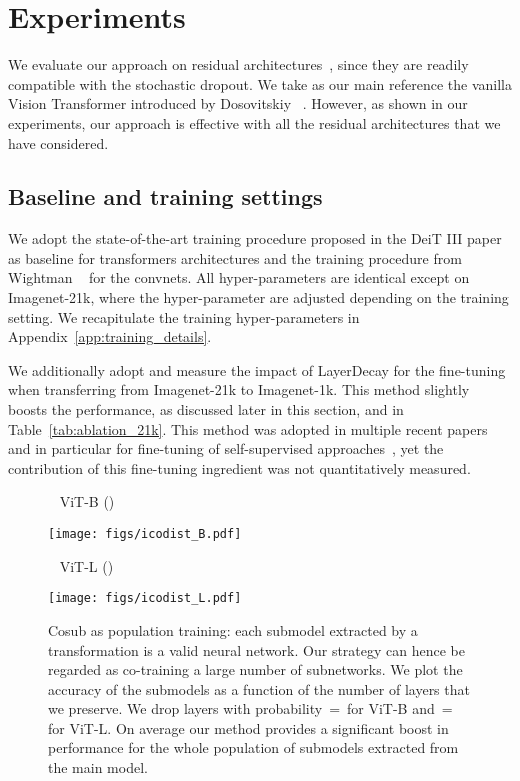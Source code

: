 \section{Experiments}

We evaluate our approach on residual architectures~\cite{He2016ResNet,He2016IdentityMappings}, since they are readily compatible with the stochastic dropout.  We take as our main reference the vanilla Vision Transformer introduced by Dosovitskiy \etal~\cite{dosovitskiy2020image}. 
However, as shown  in our experiments, our approach is effective with all the residual architectures that we have considered. 


\subsection{Baseline and training settings}

We adopt the state-of-the-art training procedure proposed in the DeiT III paper~\cite{touvron2022deitIII} as baseline for transformers architectures and the training procedure from Wightman \etal~\cite{wightman2021resnet} for the convnets. 
All hyper-parameters are identical except on Imagenet-21k, where the hyper-parameter  are adjusted depending on the training setting. We recapitulate the training hyper-parameters in Appendix~\ref{app:training_details}. 

 We additionally adopt and measure the impact of LayerDecay for the fine-tuning when transferring from Imagenet-21k to Imagenet-1k. This method slightly boosts the performance, as discussed later in this section, and in Table~\ref{tab:ablation_21k}. This method was adopted in multiple recent papers and in particular for fine-tuning of self-supervised approaches~\cite{bao2021beit,He2021MaskedAA}, yet the contribution of this fine-tuning ingredient was not quantitatively measured.

\begin{figure}
\begin{minipage}{0.48 \linewidth}
~ \hfill \quad \small ViT-B () \hfill  ~
    
    \texttt{[image: figs/icodist\_B.pdf]}
    \end{minipage}
    \hfill
    \begin{minipage}{0.48 \linewidth}
    ~ \hfill \small ViT-L () \hfill  ~
    
    \texttt{[image: figs/icodist\_L.pdf]}
    \end{minipage}
    \vspace{-0.5em}
    \caption{Cosub as population training: each submodel extracted by a transformation  is a valid neural network. Our \ours strategy can hence be regarded as co-training a large number of subnetworks. We plot the accuracy of the submodels as a function of the number of layers that we preserve. 
    We drop layers with probability \,=\, for ViT-B and \,=\, for ViT-L.  
    On average our method provides a significant boost in performance for the whole population of submodels extracted from the main model. 
\label{fig:sub_mod}}
\end{figure}



